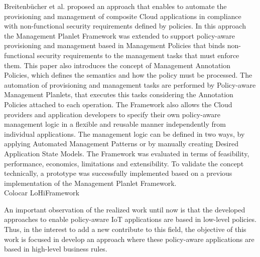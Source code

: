 Breitenb\"{u}cher et al. \cite{breitenbucher2014policy} proposed an approach that enables to automate the provisioning and management of composite Cloud applications in compliance with non-functional security requirements
defined by policies. In this approach the Management Planlet Framework \cite{breitenbucher2013policy} was extended to support policy-aware provisioning and management based in Management Policies that binds non-functional
security requirements to the management tasks that must enforce them. This paper also introduces the concept of Management Annotation Policies, which defines the semantics and how the policy must be processed.
The automation of provisioning and management tasks are performed by Policy-aware Management Planlets, that executes this tasks considering the Annotation Policies attached to each operation. The Framework also allows the
Cloud providers and application developers to specify their own policy-aware management logic in a flexible and reusable manner independently from individual applications. The management logic can be defined in two ways,
by applying Automated Management Patterns or by manually creating Desired Application State Models. The Framework was evaluated in terms of feasibility, performance, economics, limitations and extensibility. To validate
the concept technically, a prototype was successfully implemented based on a previous implementation of the Management Planlet Framework.\\

Colocar LoHiFramework 

An important observation of the realized work until now is that the developed approaches to enable policy-aware IoT applications are based in low-level policies. Thus, in the interest to add a new contribute to this field, the
objective of this work is focused in develop an approach where these policy-aware applications are based in high-level business rules.
